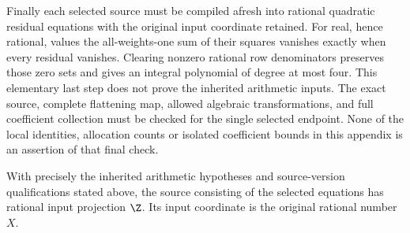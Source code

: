 Finally each selected source must be compiled afresh into rational
quadratic residual equations with the original input coordinate retained.
For real, hence rational, values the all-weights-one sum of their squares
vanishes exactly when every residual vanishes. Clearing nonzero rational
row denominators preserves those zero sets and gives an integral polynomial
of degree at most four.
This elementary last step does not prove the inherited arithmetic inputs.
The exact source, complete flattening map, allowed algebraic transformations,
and full coefficient collection must be checked for the single selected
endpoint. None of the local identities, allocation counts or isolated
coefficient bounds in this appendix is an assertion of that final check.
\begin{theorem}
\label{thm:quartic-selected-source}
With precisely the inherited arithmetic hypotheses and source-version
qualifications stated above, the source consisting of the selected
equations has rational input projection $\Z$. Its input coordinate is the
original rational number $X$.
\end{theorem}
